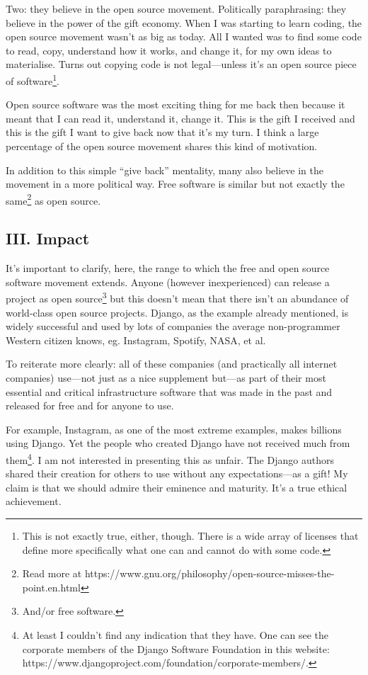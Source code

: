 Two: they believe in the open source movement. Politically paraphrasing: they believe in the power of the gift economy. When I was starting to learn coding, the open source movement wasn’t as big as today. All I wanted was to find some code to read, copy, understand how it works, and change it, for my own ideas to materialise. Turns out copying code is not legal—unless it’s an open source piece of software\footnote{This is not exactly true, either, though. There is a wide array of licenses that define more specifically what one can and cannot do with some code.}.

Open source software was the most exciting thing for me back then because it meant that I can read it, understand it, change it. This is the gift I received and this is the gift I want to give back now that it’s my turn. I think a large percentage of the open source movement shares this kind of motivation.

In addition to this simple “give back” mentality, many also believe in the movement in a more political way. Free software is similar but not exactly the same\footnote{Read more at https://www.gnu.org/philosophy/open-source-misses-the-point.en.html} as open source.

\subsection{III. Impact}

It’s important to clarify, here, the range to which the free and open source software movement extends. Anyone (however inexperienced) can release a project as open source\footnote{And/or free software.} but this doesn’t mean that there isn’t an abundance of world-class open source projects. Django, as the example already mentioned, is widely successful and used by lots of companies the average non-programmer Western citizen knows, eg. Instagram, Spotify, NASA, et al.

To reiterate more clearly: all of these companies (and practically all internet companies) use—not just as a nice supplement but—as part of their most essential and critical infrastructure software that was made in the past and released for free and for anyone to use.

For example, Instagram, as one of the most extreme examples, makes billions using Django. Yet the people who created Django have not received much from them\footnote{At least I couldn’t find any indication that they have. One can see the corporate members of the Django Software Foundation in this website: https://www.djangoproject.com/foundation/corporate-members/.}. I am not interested in presenting this as unfair. The Django authors shared their creation for others to use without any expectations—as a gift! My claim is that we should admire their eminence and maturity. It’s a true ethical achievement.


